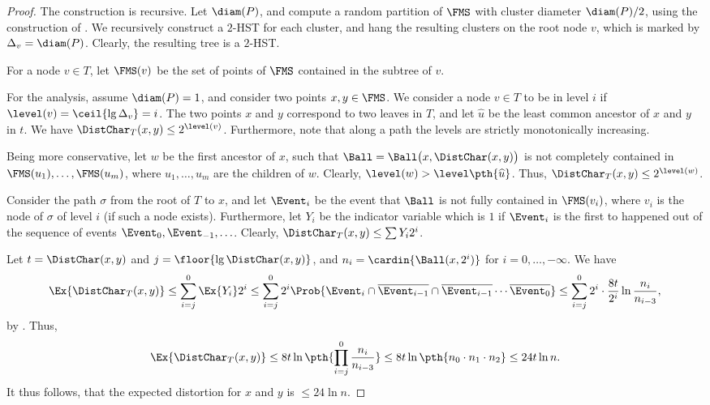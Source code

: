 \begin{proof}
    The construction is recursive. Let $\diam(P)$, and
    compute a random partition of $\FMS$ with cluster diameter
    $\diam(P)/2$, using the construction of . We
    recursively construct a $2$-HST for each cluster, and hang the
    resulting clusters on the root node $v$, which is marked by
    $\Delta_v = \diam(P)$. Clearly, the resulting tree is a $2$-HST.
    
    For a node $v \in T$, let $\FMS(v)$ be the set of points of $\FMS$
    contained in the subtree of $v$.

    For the analysis, assume $\diam(P)=1$, and consider two points
    $x,y \in \FMS$. We consider a node $v \in T$ to be in level $i$ if
    $\level(v) = \ceil{\lg \Delta_v } =i$. The two points $x$ and $y$
    correspond to two leaves in $T$, and let $\widehat{u}$ be the least common
    ancestor of $x$ and $y$ in $t$. We have $\DistChar_T(x,y) \leq
    2^{\level(v)}$. Furthermore, note that along a path the levels are
    strictly monotonically increasing.
    
    Being more conservative, let $w$ be the first ancestor of $x$,
    such that $\Ball = \Ball \bigl( x,\DistChar(x,y) \bigr)$ is not
    completely contained in $\FMS({u_1}), \ldots, \FMS({u_m})$, where
    $u_1, \ldots, u_m$ are the children of $w$. Clearly,
    $\level(w) > \level\pth{\widehat{ u}}$. Thus,
    $\DistChar_T(x,y) \leq 2^{\level(w)}$.
    
    Consider the path $\sigma$ from the root of $T$ to $x$, and let
    $\Event_i$ be the event that $\Ball$ is not fully contained in
    $\FMS(v_i)$, where $v_i$ is the node of $\sigma$ of level $i$ (if
    such a node exists). Furthermore, let $Y_i$ be the indicator
    variable which is $1$ if $\Event_i$ is the first to happened out
    of the sequence of events $\Event_0, \Event_{-1}, \ldots$.
    Clearly, $\DistChar_T(x,y) \leq \sum Y_i 2^i$.
    
    Let $t = \DistChar(x,y)$ and $j = \floor{\lg \DistChar(x,y)}$, and $n_i =
    \cardin{\Ball(x,2^i)}$ for $i=0, \ldots, -\infty$. We have
    \begin{equation*}
    \Ex{ \DistChar_T(x,y)} \leq \sum_{i=j}^{0} \Ex{Y_i} 2^i \leq
    \sum_{i=j}^{0} 2^i \Prob{ \Event_i \cap \overline{\Event_{i-1}}
       \cap \overline{\Event_{i-1}} \cdots \overline{\Event_{0}}} \leq
    \sum_{i=j}^{0} 2^i \cdot \frac{8t}{2^i} \ln \frac{n_i}{n_{i-3}},
    \end{equation*}
    by . Thus,
    \begin{equation*}
    \Ex{ \DistChar_T(x,y)} \leq 8t \ln \pth{\prod_{i=j}^{0}
       \frac{n_i}{n_{i-3}}}
    \leq 8t \ln \pth{ n_0 \cdot n_1 \cdot n_2 }
    \leq 24 t \ln n.
    \end{equation*}
    It thus follows, that the expected distortion for $x$ and $y$ is
    $\leq 24 \ln n$.
\end{proof}

